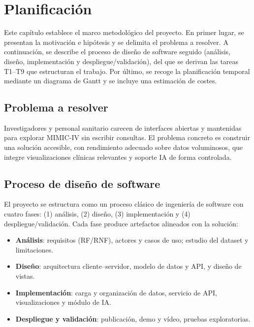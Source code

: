 \chapter{Planificación}

Este capítulo establece el marco metodológico del proyecto. En primer lugar, se presentan la motivación e hipótesis y se delimita el problema a resolver. A continuación, se describe el proceso de diseño de software seguido (análisis, diseño, implementación y despliegue/validación), del que se derivan las tareas T1–T9 que estructuran el trabajo. Por último, se recoge la planificación temporal mediante un diagrama de Gantt y se incluye una estimación de costes.



\section{Problema a resolver}

Investigadores y personal sanitario carecen de interfaces abiertas y mantenidas para explorar MIMIC-IV sin escribir consultas. El problema concreto es construir una solución accesible, con rendimiento adecuado sobre datos voluminosos, que integre visualizaciones clínicas relevantes y soporte IA de forma controlada.

\section{Proceso de diseño de software}

El proyecto se estructura como un proceso clásico de ingeniería de software con cuatro fases: (1) análisis, (2) diseño, (3) implementación y (4) despliegue/validación. Cada fase produce artefactos alineados con la solución:
\begin{itemize}
  \item \textbf{Análisis}: requisitos (RF/RNF), actores y casos de uso; estudio del dataset y limitaciones.
  \item \textbf{Diseño}: arquitectura cliente–servidor, modelo de datos y API, y diseño de vistas.
  \item \textbf{Implementación}: carga y organización de datos, servicio de API, visualizaciones y módulo de IA.
  \item \textbf{Despliegue y validación}: publicación, demo y vídeo, pruebas exploratorias.
\end{itemize}

